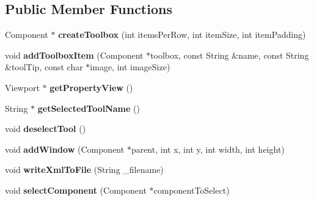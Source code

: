 \subsection*{Public Member Functions}
\begin{DoxyCompactItemize}
\item 
\hypertarget{class_j_u_c_e___designer_a99543579daf52cfa413726bb360d2149}{Component $\ast$ {\bfseries create\-Toolbox} (int items\-Per\-Row, int item\-Size, int item\-Padding)}\label{class_j_u_c_e___designer_a99543579daf52cfa413726bb360d2149}

\item 
\hypertarget{class_j_u_c_e___designer_afc5109b1e779cab9a2c1dcab7a041dd0}{void {\bfseries add\-Toolbox\-Item} (Component $\ast$toolbox, const String \&name, const String \&tool\-Tip, const char $\ast$image, int image\-Size)}\label{class_j_u_c_e___designer_afc5109b1e779cab9a2c1dcab7a041dd0}

\item 
\hypertarget{class_j_u_c_e___designer_a017758c079bd2aa84023d5a60e892fd4}{Viewport $\ast$ {\bfseries get\-Property\-View} ()}\label{class_j_u_c_e___designer_a017758c079bd2aa84023d5a60e892fd4}

\item 
\hypertarget{class_j_u_c_e___designer_a295214f3c7def237fc1670f4d2f2c994}{String $\ast$ {\bfseries get\-Selected\-Tool\-Name} ()}\label{class_j_u_c_e___designer_a295214f3c7def237fc1670f4d2f2c994}

\item 
\hypertarget{class_j_u_c_e___designer_a4dfeb57c651d285bd292390f83804d55}{void {\bfseries deselect\-Tool} ()}\label{class_j_u_c_e___designer_a4dfeb57c651d285bd292390f83804d55}

\item 
\hypertarget{class_j_u_c_e___designer_a5f66c79ae9ce9831feacf2501d7b07f8}{void {\bfseries add\-Window} (Component $\ast$parent, int x, int y, int width, int height)}\label{class_j_u_c_e___designer_a5f66c79ae9ce9831feacf2501d7b07f8}

\item 
\hypertarget{class_j_u_c_e___designer_a9c9e01e32da855dc480df50ce18fe6c2}{void {\bfseries write\-Xml\-To\-File} (String \-\_\-filename)}\label{class_j_u_c_e___designer_a9c9e01e32da855dc480df50ce18fe6c2}

\item 
\hypertarget{class_j_u_c_e___designer_aa0df012cd5e7a5446204e760ffce7c2f}{void {\bfseries select\-Component} (Component $\ast$component\-To\-Select)}\label{class_j_u_c_e___designer_aa0df012cd5e7a5446204e760ffce7c2f}


\end{DoxyCompactItemize}
